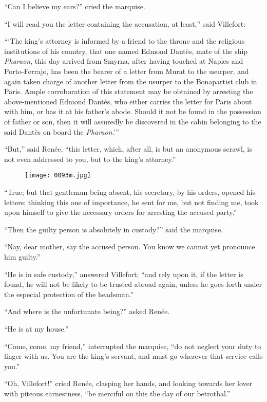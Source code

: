 “Can I believe my ears?” cried the marquise.

“I will read you the letter containing the accusation, at least,” said
Villefort:

“‘The king’s attorney is informed by a friend to the throne and the
religious institutions of his country, that one named Edmond Dantès,
mate of the ship \textit{Pharaon}, this day arrived from Smyrna, after having
touched at Naples and Porto-Ferrajo, has been the bearer of a letter
from Murat to the usurper, and again taken charge of another letter
from the usurper to the Bonapartist club in Paris. Ample corroboration
of this statement may be obtained by arresting the above-mentioned
Edmond Dantès, who either carries the letter for Paris about with him,
or has it at his father’s abode. Should it not be found in the
possession of father or son, then it will assuredly be discovered in
the cabin belonging to the said Dantès on board the \textit{Pharaon}.’”

“But,” said Renée, “this letter, which, after all, is but an anonymous
scrawl, is not even addressed to you, but to the king’s attorney.”

\begin{figure}[h]
\texttt{[image: 0093m.jpg]}
\end{figure}

“True; but that gentleman being absent, his secretary, by his orders,
opened his letters; thinking this one of importance, he sent for me,
but not finding me, took upon himself to give the necessary orders for
arresting the accused party.”

“Then the guilty person is absolutely in custody?” said the marquise.

“Nay, dear mother, say the accused person. You know we cannot yet
pronounce him guilty.”

“He is in safe custody,” answered Villefort; “and rely upon it, if the
letter is found, he will not be likely to be trusted abroad again,
unless he goes forth under the especial protection of the headsman.”

“And where is the unfortunate being?” asked Renée.

“He is at my house.”

“Come, come, my friend,” interrupted the marquise, “do not neglect your
duty to linger with us. You are the king’s servant, and must go
wherever that service calls you.”

“Oh, Villefort!” cried Renée, clasping her hands, and looking towards
her lover with piteous earnestness, “be merciful on this the day of our
betrothal.”


